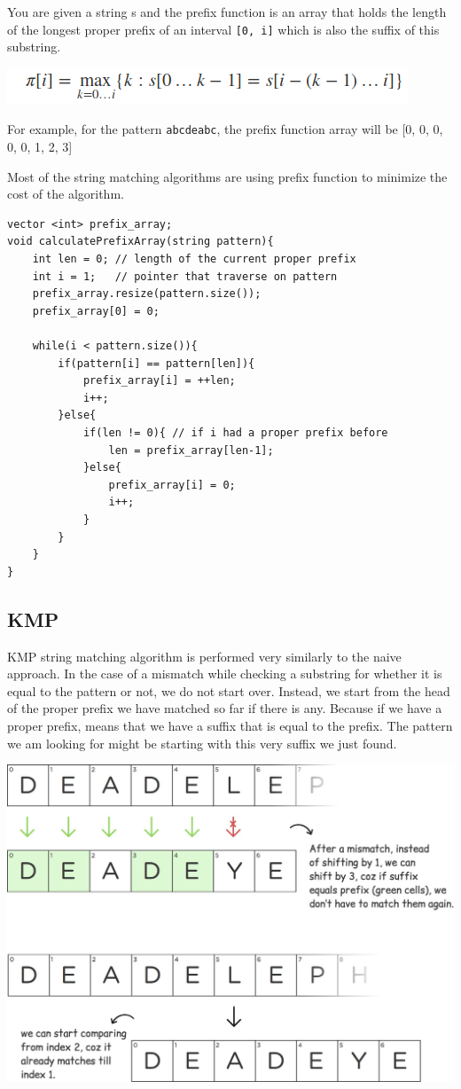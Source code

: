 \documentclass[12pt]{article}
\begin{document}
        You are given a string s and the prefix function is an array that holds the length of the longest proper prefix of an interval \texttt{[0, i]} which is also the suffix of this substring.
        
        \includegraphics[width=\linewidth/2]{proper_prefixes.png}
        
        For example, for the pattern \texttt{abcdeabc}, the prefix function array will be [0, 0, 0, 0, 0, 1, 2, 3]
        
        Most of the string matching algorithms are using prefix function to minimize the cost of the algorithm.
        
        \begin{verbatim}
vector <int> prefix_array;
void calculatePrefixArray(string pattern){
	int len = 0; // length of the current proper prefix
	int i = 1;   // pointer that traverse on pattern 
	prefix_array.resize(pattern.size());
	prefix_array[0] = 0;
	
	while(i < pattern.size()){
		if(pattern[i] == pattern[len]){
			prefix_array[i] = ++len;
			i++;
		}else{
			if(len != 0){ // if i had a proper prefix before
				len = prefix_array[len-1];
			}else{
				prefix_array[i] = 0;
				i++;
			}
		}
	}
}
        \end{verbatim}
        
        \subsection{KMP}
        KMP string matching algorithm is performed very similarly to the naive approach. In the case of a mismatch while checking a substring for whether it is equal to the pattern or not, we do not start over. Instead, we start from the head of the proper prefix we have matched so far if there is any. Because if we have a proper prefix, means that we have a suffix that is equal to the prefix. The pattern we am looking for might be starting with this very suffix we just found. 
        
        \includegraphics[width=\linewidth/1]{kmp.jpeg}
        
\end{document}
